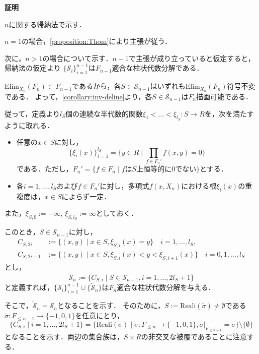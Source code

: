 \documentclass[uplatex, dvipdfmx]{jsarticle}
\makeatletter
\numberwithin{equation}{section}
\renewenvironment{proof}[1][\proofname]{\par
  \pushQED{\qed}%
  \normalfont \topsep6\p@\@plus6\p@\relax
  \trivlist
  \item\relax
  {\bfseries
  #1\@addpunct{.}}\hspace\labelsep\ignorespaces
}{
  \popQED\endtrivlist\@endpefalse
}
\newcommand{\calS}{\mathcal{S}}
\newcommand{\Elim}{\mathrm{Elim}}
\newcommand{\Reali}{\mathrm{Reali}}
\newcommand{\map}[3]{{#1}\colon{#2}\rightarrow{#3}}
\theoremstyle{definition}
\renewcommand{\proofname}{\textbf{証明}}
\makeatother
\begin{document}
\begin{proof}
     $n$に関する帰納法で示す．

     $n=1$の場合，\cref{proposition:Thom}により主張が従う．

     次に，$n>1$の場合について示す．$n-1$で主張が成り立っていると仮定すると，帰納法の仮定より
     $\{\calS_{i}\}_{i=1}^{n-1}$は$F_{n-1}$適合な柱状代数分解である．

     $\Elim_{X_n}(F_n) \subset F_{n-1}$であるから，各$S \in \calS_{n-1}$はいずれも$\Elim_{X_n}(F_n)$符号不変である．
     よって，\cref{corollary:inv-deline}より，各$S \in \calS_{n-1}$は$F_n$描画可能である．

     従って，定義より$l_S$個の連続な半代数的関数$\map{\xi_1<\dots<\xi_{l_S}}{S}{R}$を，次を満たすように取れる．
     \begin{itemize}
          \item 任意の$ x \in S $に対し，
          \begin{equation}
               \{\xi_i(x)\}_{i=1}^{l_S} = \{y \in R \mid \prod_{f \in F_n'}f(x,y)=0\}
          \end{equation}
          である．ただし，$F_n' = \{f \in F_n \mid \text{$f$は$S$上恒等的に$0$でない}\}$とする．
          \item 各$i=1, \dots, l_S$および$f \in F_n'$に対し，多項式$f(x,X_n)$における根$\xi_i(x)$の重複度は，$x\in S$によらず一定．
     \end{itemize}
     また，$\xi_{S,0} := -\infty$, $\xi_{S,l_S} := \infty$としておく．

     このとき，$S \in \calS_{n-1}$に対し，
     \begin{align}
          C_{S,2i} &:= \{(x,y) \mid  x \in S, \xi_{S,i}(x) = y \} \quad i = 1,\dots, l_S,\\
          C_{S,2i+1} &:= \{(x,y) \mid x \in S, \xi_{S,i}(x)<y<\xi_{S,i+1}(x) \} \quad i = 0,1, \dots, l_S 
     \end{align}
     とし，
     \begin{equation}
          \widetilde{\calS}_n := \{C_{S,i} \mid S \in \calS_{n-1}, i=1, \dots, 2l_S+1 \}
     \end{equation}
     と定義すれば，$\{\calS_i\}_{i=1}^{n-1} \cup \{\widetilde{\calS}_n\}$は$F_n$適合な柱状代数分解を与える．

     そこで，$\widetilde{\calS}_n = \calS_n$となることを示す．
     そのために，$S:=\Reali(\widetilde{\sigma}) \neq \emptyset$である$\map{\widetilde{\sigma}}{F_{\leq n-1}}{\{-1,0,1\}}$を任意にとり，
     \begin{equation}
          \{C_{S,i} \mid i=1, \dots, 2l_S + 1\} = \{\Reali(\sigma) \mid \map{\sigma}{F_{\leq n}}{\{-1,0,1\}}, \sigma|_{F_{\leq n-1}} = \widetilde{\sigma}\} \setminus \{\emptyset\}
     \end{equation}
     となることを示す．両辺の集合族は，$S \times R$の非交叉な被覆であることに注意する．


\end{proof}
\end{document}
